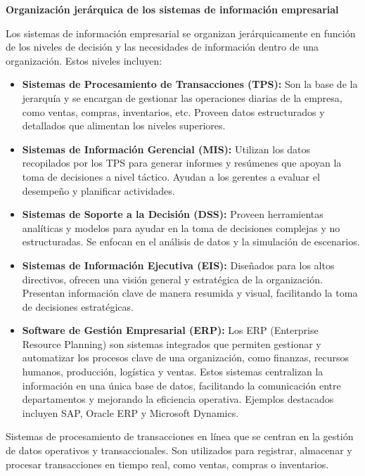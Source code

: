 \documentclass[12pt]{book} %
\begin{document}
\textbf{Organización jerárquica de los sistemas de información
empresarial}

Los sistemas de información empresarial se organizan jerárquicamente en
función de los niveles de decisión y las necesidades de información
dentro de una organización. Estos niveles incluyen:

\begin{itemize}
\item
  \textbf{Sistemas de Procesamiento de Transacciones (TPS):} Son la base
  de la jerarquía y se encargan de gestionar las operaciones diarias de
  la empresa, como ventas, compras, inventarios, etc. Proveen datos
  estructurados y detallados que alimentan los niveles superiores.
\item
  \textbf{Sistemas de Información Gerencial (MIS):} Utilizan los datos
  recopilados por los TPS para generar informes y resúmenes que apoyan
  la toma de decisiones a nivel táctico. Ayudan a los gerentes a evaluar
  el desempeño y planificar actividades.
\item
  \textbf{Sistemas de Soporte a la Decisión (DSS):} Proveen herramientas
  analíticas y modelos para ayudar en la toma de decisiones complejas y
  no estructuradas. Se enfocan en el análisis de datos y la simulación
  de escenarios.
\item
  \textbf{Sistemas de Información Ejecutiva (EIS):} Diseñados para los
  altos directivos, ofrecen una visión general y estratégica de la
  organización. Presentan información clave de manera resumida y visual,
  facilitando la toma de decisiones estratégicas.
\item
  \textbf{Software de Gestión Empresarial (ERP):} Los ERP (Enterprise
  Resource Planning) son sistemas integrados que permiten gestionar y
  automatizar los procesos clave de una organización, como finanzas,
  recursos humanos, producción, logística y ventas. Estos sistemas
  centralizan la información en una única base de datos, facilitando la
  comunicación entre departamentos y mejorando la eficiencia operativa.
  Ejemplos destacados incluyen SAP, Oracle ERP y Microsoft Dynamics.
\end{itemize}


\begin{definicion}
Sistemas de procesamiento de transacciones en línea que se centran en la gestión de datos operativos y transaccionales. Son utilizados para registrar, almacenar y procesar transacciones en tiempo real, como ventas, compras o inventarios.
\end{definicion}
\end{document}
